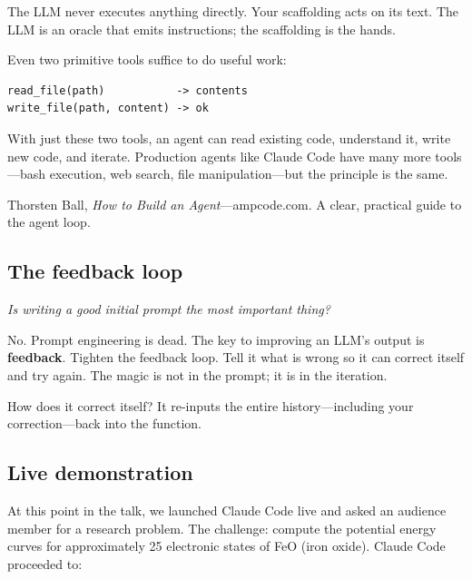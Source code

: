 \begin{keyresult}
  The LLM never executes anything directly.  Your scaffolding acts on
  its text.  The LLM is an oracle that emits instructions; the
  scaffolding is the hands.
\end{keyresult}

Even two primitive tools suffice to do useful work:

\begin{lstlisting}
read_file(path)           -> contents
write_file(path, content) -> ok
\end{lstlisting}

With just these two tools, an agent can read existing code, understand
it, write new code, and iterate.  Production agents like Claude Code
have many more tools---bash execution, web search, file
manipulation---but the principle is the same.

\begin{greybox}
  Thorsten Ball, \emph{How to Build an Agent}---ampcode.com.  A clear,
  practical guide to the agent loop.
\end{greybox}

\subsection{The feedback loop}

\begin{audience}
  \emph{Is writing a good initial prompt the most important thing?}

  No.  Prompt engineering is dead.  The key to improving an LLM's output
  is \textbf{feedback}.  Tighten the feedback loop.  Tell it what is
  wrong so it can correct itself and try again.  The magic is not in the
  prompt; it is in the iteration.

  How does it correct itself?  It re-inputs the entire history---including
  your correction---back into the function.
\end{audience}

\subsection{Live demonstration}

At this point in the talk, we launched Claude Code live and asked an
audience member for a research problem.  The challenge: compute the
potential energy curves for approximately 25 electronic states of FeO
(iron oxide).  Claude Code proceeded to:

